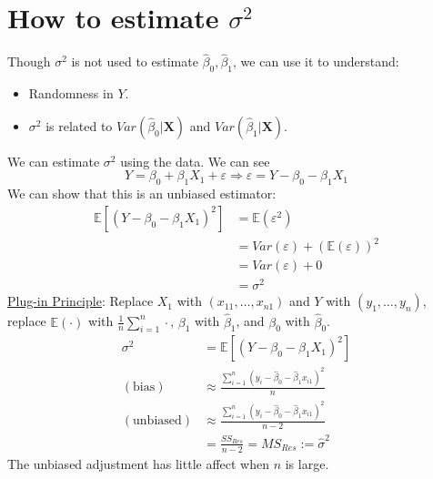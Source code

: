 \documentclass{article}
\newcommand{\E}{\mathbb{E}}
\newcommand{\boldX}{\mathbf{X}}
\newcommand{\sumiton}{\sum_{i=1}^n}
\newcommand{\betahat}{\hat{\beta}}
\begin{document}
\section{How to estimate $\sigma^2$}
Though $\sigma^2$ is not used to estimate $\betahat_0,\betahat_1$, we can use it to understand:
\begin{itemize}
    \item Randomness in $Y$.
    \item $\sigma^2$ is related to $Var(\betahat_0 | \boldX)$ and $Var(\betahat_1 | \boldX)$.
\end{itemize}
We can estimate $\sigma^2$ using the data. We can see
\[Y = \beta_0 + \beta_1X_1 + \varepsilon \Rightarrow \varepsilon = Y - \beta_0 - \beta_1X_1\]
We can show that this is an unbiased estimator:
\begin{align}
    \E[(Y-\beta_0 - \beta_1X_1)^2] &= \E(\varepsilon^2)\\
    &= Var(\varepsilon) + (\E(\varepsilon))^2\\
    &= Var(\varepsilon) + 0\\
    &= \sigma^2
\end{align}
\underline{Plug-in Principle}: Replace $X_1$ with $(x_{11},\ldots,x_{n1})$ and $Y$ with $(y_1,\ldots,y_n)$, replace $\E(\cdot)$ with $\frac{1}{n}\sumiton \cdot$, $\beta_1$ with $\betahat_1$, and $\beta_0$ with $\betahat_0$.
\begin{align}
    \sigma^2 &= \E[(Y - \beta_0 - \beta_1X_1)^2]\\
    (\text{bias}) &\approx \frac{\sumiton (y_i - \betahat_0 - \betahat_1x_{i1})^2}{n}\\
    (\text{unbiased}) &\approx \frac{\sumiton (y_i - \betahat_0 - \betahat_1x_{i1})^2}{n-2}\\
    &= \frac{SS_{Res}}{n-2} =MS_{Res} := \hat{\sigma}^2
\end{align}
The unbiased adjustment has little affect when $n$ is large.
\end{document}
